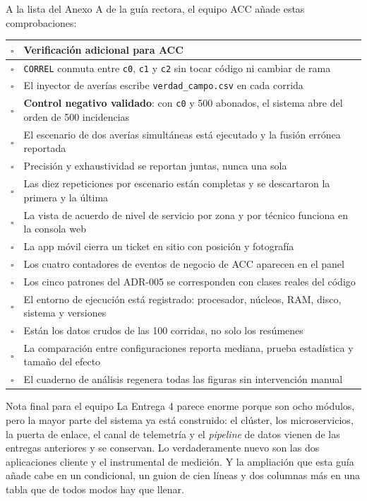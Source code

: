 \documentclass[11pt,a4paper]{article}
\begin{document}
A la lista del Anexo A de la guía rectora, el equipo ACC añade estas comprobaciones:

\begin{center}
	\small
	\begin{tabular}{@{}p{0.7cm}p{14.2cm}@{}}
		\toprule
		\textbf{$\square$} & \textbf{Verificación adicional para ACC} \\
		\midrule
		$\square$ & \texttt{CORREL} conmuta entre \texttt{c0}, \texttt{c1} y \texttt{c2} sin tocar código ni cambiar de rama \\
		$\square$ & El inyector de averías escribe \texttt{verdad\_campo.csv} en cada corrida \\
		$\square$ & \textbf{Control negativo validado}: con \texttt{c0} y 500 abonados, el sistema abre del orden de 500 incidencias \\
		$\square$ & El escenario de dos averías simultáneas está ejecutado y la fusión errónea reportada \\
		$\square$ & Precisión y exhaustividad se reportan juntas, nunca una sola \\
		$\square$ & Las diez repeticiones por escenario están completas y se descartaron la primera y la última \\
		$\square$ & La vista de acuerdo de nivel de servicio por zona y por técnico funciona en la consola web \\
		$\square$ & La app móvil cierra un ticket en sitio con posición y fotografía \\
		$\square$ & Los cuatro contadores de eventos de negocio de ACC aparecen en el panel \\
		$\square$ & Los cinco patrones del ADR-005 se corresponden con clases reales del código \\
		$\square$ & El entorno de ejecución está registrado: procesador, núcleos, RAM, disco, sistema y versiones \\
		$\square$ & Están los datos crudos de las 100 corridas, no solo los resúmenes \\
		$\square$ & La comparación entre configuraciones reporta mediana, prueba estadística y tamaño del efecto \\
		$\square$ & El cuaderno de análisis regenera todas las figuras sin intervención manual \\
		\bottomrule
	\end{tabular}
\end{center}

\vspace{6pt}
\begin{uteqbox}{Nota final para el equipo}
	La Entrega 4 parece enorme porque son ocho módulos, pero la mayor parte del sistema ya está construido: el clúster, los microservicios, la puerta de enlace, el canal de telemetría y el \emph{pipeline} de datos vienen de las entregas anteriores y se conservan. Lo verdaderamente nuevo son las dos aplicaciones cliente y el instrumental de medición. Y la ampliación que esta guía añade cabe en un condicional, un guion de cien líneas y dos columnas más en una tabla que de todos modos hay que llenar.
\end{uteqbox}
\end{document}
